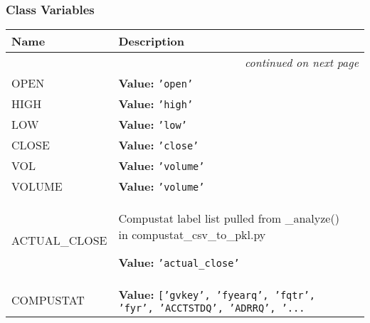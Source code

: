 
  \subsubsection{Class Variables}

    \vspace{-1cm}
\hspace{\varindent}\begin{longtable}{|p{\varnamewidth}|p{\vardescrwidth}|l}
\cline{1-2}
\cline{1-2} \centering \textbf{Name} & \centering \textbf{Description}& \\
\cline{1-2}
\endhead\cline{1-2}\multicolumn{3}{r}{\small\textit{continued on next page}}\\\endfoot\cline{1-2}
\endlastfoot\raggedright O\-P\-E\-N\- & \raggedright \textbf{Value:} 
{\tt \texttt{'}\texttt{open}\texttt{'}}&\\
\cline{1-2}
\raggedright H\-I\-G\-H\- & \raggedright \textbf{Value:} 
{\tt \texttt{'}\texttt{high}\texttt{'}}&\\
\cline{1-2}
\raggedright L\-O\-W\- & \raggedright \textbf{Value:} 
{\tt \texttt{'}\texttt{low}\texttt{'}}&\\
\cline{1-2}
\raggedright C\-L\-O\-S\-E\- & \raggedright \textbf{Value:} 
{\tt \texttt{'}\texttt{close}\texttt{'}}&\\
\cline{1-2}
\raggedright V\-O\-L\- & \raggedright \textbf{Value:} 
{\tt \texttt{'}\texttt{volume}\texttt{'}}&\\
\cline{1-2}
\raggedright V\-O\-L\-U\-M\-E\- & \raggedright \textbf{Value:} 
{\tt \texttt{'}\texttt{volume}\texttt{'}}&\\
\cline{1-2}
\raggedright A\-C\-T\-U\-A\-L\-\_\-C\-L\-O\-S\-E\- & \raggedright Compustat label list pulled from \_analyze() in 
          compustat\_csv\_to\_pkl.py

\textbf{Value:} 
{\tt \texttt{'}\texttt{actual\_close}\texttt{'}}&\\
\cline{1-2}
\raggedright C\-O\-M\-P\-U\-S\-T\-A\-T\- & \raggedright \textbf{Value:} 
{\tt \texttt{[}\texttt{'}\texttt{gvkey}\texttt{'}\texttt{, }\texttt{'}\texttt{fyearq}\texttt{'}\texttt{, }\texttt{'}\texttt{fqtr}\texttt{'}\texttt{, }\texttt{'}\texttt{fyr}\texttt{'}\texttt{, }\texttt{'}\texttt{ACCTSTDQ}\texttt{'}\texttt{, }\texttt{'}\texttt{ADRRQ}\texttt{'}\texttt{, }\texttt{'}\texttt{...}}&\\
\cline{1-2}
\end{longtable}

